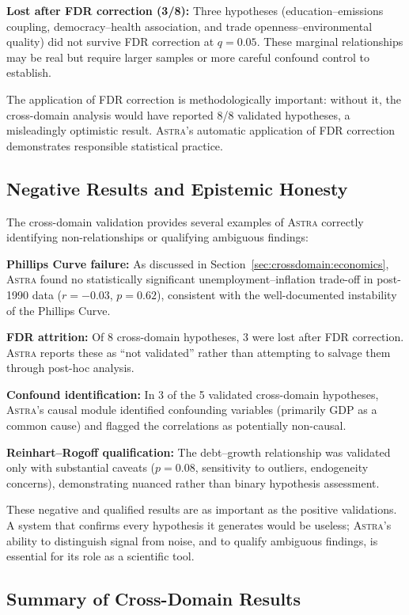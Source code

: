 \documentclass[usenatbib]{rasti}
\newcommand{\astra}{\textsc{Astra}\xspace}
\begin{document}
\textbf{Lost after FDR correction (3/8):}
Three hypotheses (education--emissions coupling, democracy--health association, and trade openness--environmental quality) did not survive FDR correction at $q = 0.05$. These marginal relationships may be real but require larger samples or more careful confound control to establish.

The application of FDR correction is methodologically important: without it, the cross-domain analysis would have reported 8/8 validated hypotheses, a misleadingly optimistic result. \astra's automatic application of FDR correction demonstrates responsible statistical practice.

\subsection{Negative Results and Epistemic Honesty}
\label{sec:crossdomain:negatives}

The cross-domain validation provides several examples of \astra correctly identifying non-relationships or qualifying ambiguous findings:

\textbf{Phillips Curve failure:} As discussed in Section~\ref{sec:crossdomain:economics}, \astra found no statistically significant unemployment--inflation trade-off in post-1990 data ($r = -0.03$, $p = 0.62$), consistent with the well-documented instability of the Phillips Curve.

\textbf{FDR attrition:} Of 8 cross-domain hypotheses, 3 were lost after FDR correction. \astra reports these as ``not validated'' rather than attempting to salvage them through post-hoc analysis.

\textbf{Confound identification:} In 3 of the 5 validated cross-domain hypotheses, \astra's causal module identified confounding variables (primarily GDP as a common cause) and flagged the correlations as potentially non-causal.

\textbf{Reinhart--Rogoff qualification:} The debt--growth relationship was validated only with substantial caveats ($p = 0.08$, sensitivity to outliers, endogeneity concerns), demonstrating nuanced rather than binary hypothesis assessment.

These negative and qualified results are as important as the positive validations. A system that confirms every hypothesis it generates would be useless; \astra's ability to distinguish signal from noise, and to qualify ambiguous findings, is essential for its role as a scientific tool.

\subsection{Summary of Cross-Domain Results}
\end{document}
